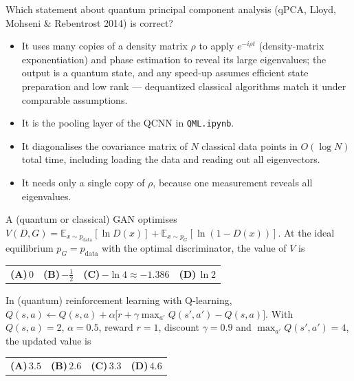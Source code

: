 \documentclass[11pt,a4paper]{article}
\newcommand{\optlabel}[1]{\textbf{(#1)}}
\newenvironment{qitem}[1]{\begin{list}{}{\setlength{\leftmargin}{3.3em}\setlength{\labelwidth}{3.1em}%
  \setlength{\labelsep}{0.2em}\setlength{\topsep}{3pt}\setlength{\parsep}{3pt}}\item[\textbf{Q.#1}\hfill]}{\end{list}}
\newcommand{\qsep}{\par\vspace{2pt}{\color{black!15}\hrule}\vspace{4pt}}
\begin{document}
\begin{qitem}{71}
Which statement about quantum principal component analysis (qPCA, Lloyd, Mohseni \& Rebentrost 2014) is correct?
\begin{itemize}[leftmargin=2.6em, labelsep=0.4em, itemsep=2pt, topsep=3pt]
\item[\optlabel{A}] It uses many copies of a density matrix $\rho$ to apply $e^{-i\rho t}$ (density-matrix exponentiation) and phase estimation to reveal its large eigenvalues; the output is a quantum state, and any speed-up assumes efficient state preparation and low rank --- dequantized classical algorithms match it under comparable assumptions.
\item[\optlabel{B}] It is the pooling layer of the QCNN in \texttt{QML.ipynb}.
\item[\optlabel{C}] It diagonalises the covariance matrix of $N$ classical data points in $O(\log N)$ total time, including loading the data and reading out all eigenvectors.
\item[\optlabel{D}] It needs only a single copy of $\rho$, because one measurement reveals all eigenvalues.
\end{itemize}
\end{qitem}
\qsep

\begin{qitem}{72}
A (quantum or classical) GAN optimises $V(D, G) = \mathbb E_{x\sim p_{\text{data}}}[\ln D(x)] + \mathbb E_{x\sim p_G}[\ln(1 - D(x))]$.
At the ideal equilibrium $p_G = p_{\text{data}}$ with the optimal discriminator, the value of $V$ is
\par\smallskip\noindent\begin{tabularx}{\linewidth}{@{}*{4}{L}@{}}
\optlabel{A}\,$0$ & \optlabel{B}\,$-\tfrac12$ & \optlabel{C}\,$-\ln 4 \approx -1.386$ & \optlabel{D}\,$\ln 2$
\end{tabularx}
\end{qitem}
\qsep

\begin{qitem}{73}
In (quantum) reinforcement learning with Q-learning, $Q(s, a) \leftarrow Q(s, a) + \alpha\big[r + \gamma\max_{a'}Q(s', a') - Q(s, a)\big]$.
With $Q(s, a) = 2$, $\alpha = 0.5$, reward $r = 1$, discount $\gamma = 0.9$ and $\max_{a'}Q(s', a') = 4$, the updated value is
\par\smallskip\noindent\begin{tabularx}{\linewidth}{@{}*{4}{L}@{}}
\optlabel{A}\,$3.5$ & \optlabel{B}\,$2.6$ & \optlabel{C}\,$3.3$ & \optlabel{D}\,$4.6$
\end{tabularx}
\end{qitem}
\qsep
\end{document}
